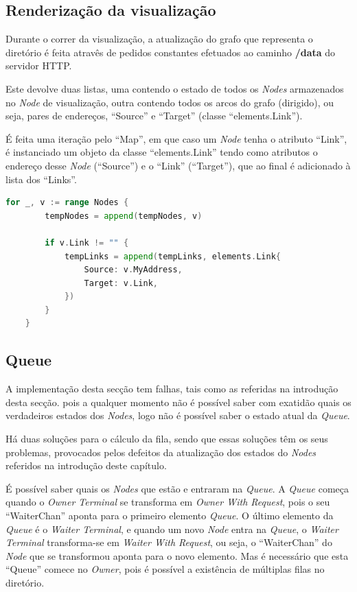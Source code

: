 \subsection*{Renderização da visualização}

Durante o correr da visualização, a atualização do grafo que representa o diretório é feita atravês de 
pedidos constantes efetuados ao caminho \textbf{/data} do servidor \acs{HTTP}.

Este devolve duas listas, uma contendo o estado de todos os \emph{Nodes} armazenados no \emph{Node} de visualização, 
outra contendo todos os arcos do grafo (dirigido), ou seja, pares de endereços, ``Source'' e ``Target'' (classe ``elements.Link''). 

É feita uma iteração pelo ``Map'', em que caso um \emph{Node} tenha o atributo ``Link'', é instanciado um objeto da classe
``elements.Link'' tendo como atributos o endereço desse \emph{Node} (``Source'') e o ``Link'' (``Target''), que ao final é 
adicionado à lista dos ``Links''.


\begin{lstlisting}[caption={Iteração pelo ``Map'' ``Nodes'', instanciação do objeto e adicionado à lista },language=Go]
	for _, v := range Nodes {
		tempNodes = append(tempNodes, v)

		if v.Link != "" {
			tempLinks = append(tempLinks, elements.Link{
				Source: v.MyAddress,
				Target: v.Link,
			})
		}
	}
\end{lstlisting}






\subsection*{Queue}
A implementação desta secção tem falhas, tais como as referidas na introdução desta secção.
pois a qualquer momento não é possível saber com exatidão quais os verdadeiros estados dos \emph{Nodes},
logo não é possível saber o estado atual da \emph{Queue}.

Há duas soluções para o cálculo da fila, sendo que essas soluções têm os seus problemas, provocados pelos defeitos da atualização dos estados do \emph{Nodes} referidos na introdução deste capítulo.


É possível saber quais os \emph{Nodes} que estão e entraram na \emph{Queue}. A \emph{Queue} começa quando o \emph{Owner Terminal} se transforma em \emph{Owner With Request}, pois o seu ``WaiterChan'' aponta para o primeiro
elemento \emph{Queue}. O último elemento da \emph{Queue} é o \emph{Waiter Terminal}, e quando um novo \emph{Node} entra na \emph{Queue}, o \emph{Waiter Terminal} transforma-se em \emph{Waiter With Request}, ou seja, o ``WaiterChan'' do \emph{Node} que se transformou aponta para o novo elemento. Mas é necessário que esta ``Queue'' comece no \emph{Owner}, pois é possível a existência de múltiplas filas no diretório.

